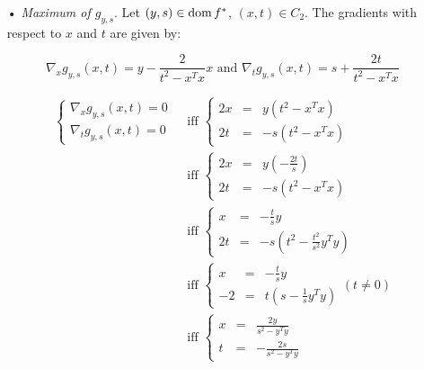 \documentclass[a4paper, 11pt]{report}
\begin{document}
\begin{itemize}
\begin{itemize}
        \item[•] \textit{Maximum of $g_{y, s}$}. Let $(y, s) \in \operatorname{dom} f^{*}$, $(x, t) \in C_{2}$. The gradients with respect to $x$ and $t$ are given by:
        
        \[ \nabla_{x} g_{y, s}(x, t) = y - \frac{2}{t^{2} - x^{T}x} x \text{ and } \nabla_{t} g_{y, s}(x, t) = s + \frac{2t}{t^{2} - x^{T}x} \]

        \begin{equation*}
            \begin{aligned}
                \left\{ \begin{array}{c}
                    \nabla_{x} g_{y, s}(x, t) = 0 \\
                    \nabla_{t} g_{y, s}(x, t) = 0
                \end{array} \right.
            &\text{ iff } \left\{ \begin{array}{lcl}
                2x &=& y \left( t^{2} - x^{T}x \right) \\
                2t &=& - s \left( t^{2} - x^{T}x \right)
            \end{array} \right. \\
            &\text{ iff } \left\{ \begin{array}{lcl}
                2x &=& y \left( - \frac{2t}{s} \right) \\
                2t &=& - s \left( t^{2} - x^{T}x \right)
            \end{array} \right. \\
            &\text{ iff } \left\{ \begin{array}{lcl}
                x &=& - \frac{t}{s} y \\
                2t &=& - s \left( t^{2} - \frac{t^{2}}{s^{2}} y^{T}y \right)
            \end{array} \right. \\
            &\text{ iff } \left\{ \begin{array}{lcl}
                x &=& - \frac{t}{s} y \\
                - 2 &=& t\left( s - \frac{1}{s} y^{T}y \right)
            \end{array} \right. (t \neq 0) \\
            &\text{ iff } \left\{ \begin{array}{lcl}
                x &=& \frac{2y}{s^{2} - y^{T}y} \\
                t &=& - \frac{2s}{s^{2} - y^{T}y}
            \end{array} \right. \\
            \end{aligned}
        \end{equation*}


\end{itemize}
\end{itemize}
\end{document}
